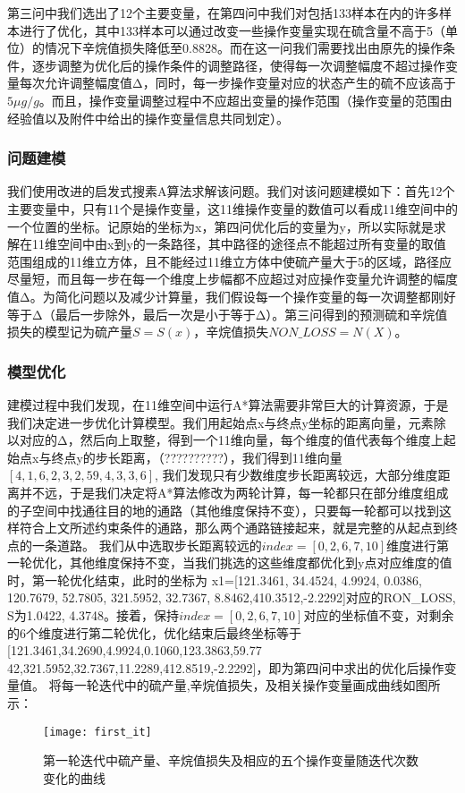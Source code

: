 \documentclass[bwprint]{gmcmthesis}
\begin{document}
第三问中我们选出了12个主要变量，在第四问中我们对包括133样本在内的许多样本进行了优化，其中133样本可以通过改变一些操作变量实现在硫含量不高于5（单位）的情况下辛烷值损失降低至0.8828。而在这一问我们需要找出由原先的操作条件，逐步调整为优化后的操作条件的调整路径，使得每一次调整幅度不超过操作变量每次允许调整幅度值Δ，同时，每一步操作变量对应的状态产生的硫不应该高于$5μg/g$。而且，操作变量调整过程中不应超出变量的操作范围（操作变量的范围由经验值以及附件中给出的操作变量信息共同划定）。

\FloatBarrier
\subsubsection{问题建模}
我们使用改进的启发式搜素A\*算法求解该问题。我们对该问题建模如下：首先12个主要变量中，只有11个是操作变量，这11维操作变量的数值可以看成11维空间中的一个位置的坐标。记原始的坐标为x，第四问优化后的变量为y，所以实际就是求解在11维空间中由x到y的一条路径，其中路径的途径点不能超过所有变量的取值范围组成的11维立方体，且不能经过11维立方体中使硫产量大于5的区域，路径应尽量短，而且每一步在每一个维度上步幅都不应超过对应操作变量允许调整的幅度值Δ。为简化问题以及减少计算量，我们假设每一个操作变量的每一次调整都刚好等于Δ（最后一步除外，最后一次是小于等于Δ）。第三问得到的预测硫和辛烷值损失的模型记为硫产量$S=S(x)$，辛烷值损失$NON\_LOSS=N(X)$。


\FloatBarrier
\subsubsection{模型优化}
建模过程中我们发现，在11维空间中运行A*算法需要非常巨大的计算资源，于是我们决定进一步优化计算模型。我们用起始点x与终点y坐标的距离向量，元素除以对应的Δ，然后向上取整，得到一个11维向量，每个维度的值代表每个维度上起始点x与终点y的步长距离，（??????????），我们得到11维向量\:$[4, 1, 6, 2, 3, 2, 59, 4, 3, 3, 6]$,
我们发现只有少数维度步长距离较远，大部分维度距离并不远，于是我们决定将A*算法修改为两轮计算，每一轮都只在部分维度组成的子空间中找通往目的地的通路（其他维度保持不变），只要每一轮都可以找到这样符合上文所述约束条件的通路，那么两个通路链接起来，就是完整的从起点到终点的一条道路。
我们从中选取步长距离较远的$index=[0,2,6,7,10]$维度进行第一轮优化，其他维度保持不变，当我们挑选的这些维度都优化到y点对应维度的值时，第一轮优化结束，此时的坐标为
x1=[121.3461, 34.4524, 4.9924, 0.0386, 120.7679, 52.7805, 321.5952, 32.7367, 8.8462,410.3512,-2.2292]对应的RON\_LOSS,  S为1.0422, 4.3748。接着，保持$index=[0,2,6,7,10]$对应的坐标值不变，对剩余的6个维度进行第二轮优化，优化结束后最终坐标等于[121.3461,34.2690,4.9924,0.1060,123.3863,59.77
42,321.5952,32.7367,11.2289,412.8519,-2.2292]，即为第四问中求出的优化后操作变量值。
将每一轮迭代中的硫产量,辛烷值损失，及相关操作变量画成曲线如图所示：
\begin{figure}[htb]
	\centering
	\texttt{[image: first\_it]}
	\caption{第一轮迭代中硫产量、辛烷值损失及相应的五个操作变量随迭代次数变化的曲线}
\end{figure}
\end{document}
